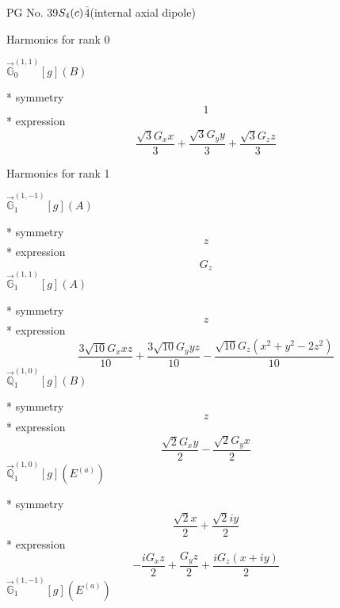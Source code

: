 \documentclass[fleqn,8pt]{jsarticle}
\begin{document}
\setcounter{MaxMatrixCols}{32}

\renewcommand{\tablename}{Table~}
\renewcommand{\figurename}{Figure~}
\begin{center}
\LARGE
PG No. 39\quad$S_{\rm 4}(c)$\quad$\bar{4}$\quad[ tetragonal ] (internal axial dipole)
\end{center}

\noindent * Harmonics for rank 0

\noindent\quad $\vec{\mathbb{G}}_{0}^{(1,1)}[g](B)$

\noindent\quad ** symmetry
\begin{dmath*}
1
\end{dmath*}
\noindent\quad ** expression
\begin{dmath*}
\frac{\sqrt{3} G_{x} x}{3} + \frac{\sqrt{3} G_{y} y}{3} + \frac{\sqrt{3} G_{z} z}{3}
\end{dmath*}

\noindent * Harmonics for rank 1

\noindent\quad $\vec{\mathbb{G}}_{1}^{(1,-1)}[g](A)$

\noindent\quad ** symmetry
\begin{dmath*}
z
\end{dmath*}
\noindent\quad ** expression
\begin{dmath*}
G_{z}
\end{dmath*}
\noindent\quad $\vec{\mathbb{G}}_{1}^{(1,1)}[g](A)$

\noindent\quad ** symmetry
\begin{dmath*}
z
\end{dmath*}
\noindent\quad ** expression
\begin{dmath*}
\frac{3 \sqrt{10} G_{x} x z}{10} + \frac{3 \sqrt{10} G_{y} y z}{10} - \frac{\sqrt{10} G_{z} \left(x^{2} + y^{2} - 2 z^{2}\right)}{10}
\end{dmath*}
\noindent\quad $\vec{\mathbb{Q}}_{1}^{(1,0)}[g](B)$

\noindent\quad ** symmetry
\begin{dmath*}
z
\end{dmath*}
\noindent\quad ** expression
\begin{dmath*}
\frac{\sqrt{2} G_{x} y}{2} - \frac{\sqrt{2} G_{y} x}{2}
\end{dmath*}
\noindent\quad $\vec{\mathbb{Q}}_{1}^{(1,0)}[g](E^{(a)})$

\noindent\quad ** symmetry
\begin{dmath*}
\frac{\sqrt{2} x}{2} + \frac{\sqrt{2} i y}{2}
\end{dmath*}
\noindent\quad ** expression
\begin{dmath*}
- \frac{i G_{x} z}{2} + \frac{G_{y} z}{2} + \frac{i G_{z} \left(x + i y\right)}{2}
\end{dmath*}
\noindent\quad $\vec{\mathbb{G}}_{1}^{(1,-1)}[g](E^{(a)})$
\end{document}
